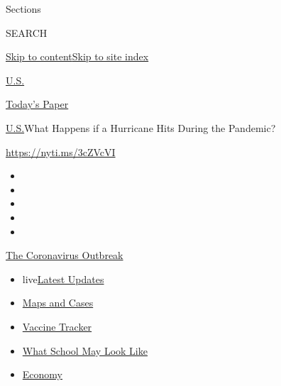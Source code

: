 Sections

SEARCH

\protect\hyperlink{site-content}{Skip to
content}\protect\hyperlink{site-index}{Skip to site index}

\href{https://www.nytimes.com/section/us}{U.S.}

\href{https://myaccount.nytimes.com/auth/login?response_type=cookie\&client_id=vi}{}

\href{https://www.nytimes.com/section/todayspaper}{Today's Paper}

\href{/section/us}{U.S.}\textbar{}What Happens if a Hurricane Hits
During the Pandemic?

\url{https://nyti.ms/3cZVcVI}

\begin{itemize}
\item
\item
\item
\item
\item
\end{itemize}

\href{https://www.nytimes.com/news-event/coronavirus?action=click\&pgtype=Article\&state=default\&region=TOP_BANNER\&context=storylines_menu}{The
Coronavirus Outbreak}

\begin{itemize}
\tightlist
\item
  live\href{https://www.nytimes.com/2020/08/02/world/coronavirus-updates.html?action=click\&pgtype=Article\&state=default\&region=TOP_BANNER\&context=storylines_menu}{Latest
  Updates}
\item
  \href{https://www.nytimes.com/interactive/2020/us/coronavirus-us-cases.html?action=click\&pgtype=Article\&state=default\&region=TOP_BANNER\&context=storylines_menu}{Maps
  and Cases}
\item
  \href{https://www.nytimes.com/interactive/2020/science/coronavirus-vaccine-tracker.html?action=click\&pgtype=Article\&state=default\&region=TOP_BANNER\&context=storylines_menu}{Vaccine
  Tracker}
\item
  \href{https://www.nytimes.com/interactive/2020/07/29/us/schools-reopening-coronavirus.html?action=click\&pgtype=Article\&state=default\&region=TOP_BANNER\&context=storylines_menu}{What
  School May Look Like}
\item
  \href{https://www.nytimes.com/live/2020/07/31/business/stock-market-today-coronavirus?action=click\&pgtype=Article\&state=default\&region=TOP_BANNER\&context=storylines_menu}{Economy}
\end{itemize}

